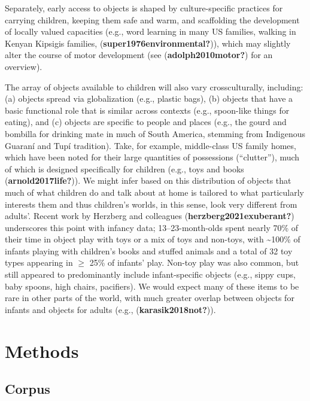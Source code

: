 \documentclass[10pt, letterpaper]{article}
\begin{document}
Separately, early access to objects is shaped by culture-specific
practices for carrying children, keeping them safe and warm, and
scaffolding the development of locally valued capacities (e.g., word
learning in many US families, walking in Kenyan Kipsigis families,
(\textbf{super1976environmental?})), which may slightly alter the course
of motor development (see (\textbf{adolph2010motor?}) for an overview).

The array of objects available to children will also vary
crossculturally, including: (a) objects spread via globalization (e.g.,
plastic bags), (b) objects that have a basic functional role that is
similar across contexts (e.g., spoon-like things for eating), and (c)
objects are specific to people and places (e.g., the gourd and bombilla
for drinking mate in much of South America, stemming from Indigenous
Guaraní and Tupí tradition). Take, for example, middle-class US family
homes, which have been noted for their large quantities of possessions
(``clutter''), much of which is designed specifically for children
(e.g., toys and books (\textbf{arnold2017life?})). We might infer based
on this distribution of objects that much of what children do and talk
about at home is tailored to what particularly interests them and thus
children's worlds, in this sense, look very different from adults'.
Recent work by Herzberg and colleagues (\textbf{herzberg2021exuberant?})
underscores this point with infancy data; 13--23-month-olds spent nearly
70\% of their time in object play with toys or a mix of toys and
non-toys, with \textasciitilde100\% of infants playing with children's
books and stuffed animals and a total of 32 toy types appearing in
\(\ge\) 25\% of infants' play. Non-toy play was also common, but still
appeared to predominantly include infant-specific objects (e.g., sippy
cups, baby spoons, high chairs, pacifiers). We would expect many of
these items to be rare in other parts of the world, with much greater
overlap between objects for infants and objects for adults (e.g.,
(\textbf{karasik2018not?})).

\hypertarget{methods}{%
\section{Methods}\label{methods}}

\hypertarget{corpus}{%
\subsection{Corpus}\label{corpus}}
\end{document}
